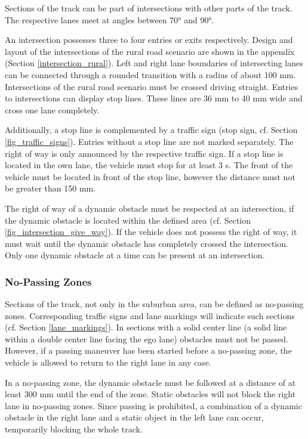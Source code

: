 Sections of the track can be part of intersections with other parts of the
track. The respective lanes meet at angles between 70° and 90°.

An intersection possesses three to four entries or exits respectively. Design
and layout of the intersections of the rural road scenario are shown in the
appendix (Section \ref{intersection_rural}). Left and right lane boundaries of
intersecting lanes can be connected through a rounded transition with a radius
of about 100 mm. Intersections of the rural road scenario must be crossed
driving straight. Entries to intersections can display stop lines. These lines
are 36 mm to 40 mm wide and cross one lane completely.

Additionally, a stop line is complemented by a traffic sign (stop sign, cf.
Section \ref{fig_traffic_signs}). Entries without a stop line are not marked
separately. The right of way is only announced by the respective traffic sign.
If a stop line is located in the own lane, the vehicle must stop for at least 3
s. The front of the vehicle must be located in front of the stop line, however
the distance must not be greater than 150 mm.

The right of way of a dynamic obstacle must be respected at an intersection, if
the dynamic obstacle is located within the defined area (cf. Section
\ref{fig_intersection_give_way}). If the vehicle does not possess the right of
way, it must wait until the dynamic obstacle has completely crossed the
intersection. Only one dynamic obstacle at a time can be present at an
intersection.

\subsubsection{No-Passing Zones}
\label{no_passing_zones}

Sections of the track, not only in the suburban area, can be defined as
no-passing zones. Corresponding traffic signs and lane markings will indicate
such sections (cf. Section \ref{lane_markings}). In sections with a solid
center line (a solid line within a double center line facing the ego lane)
obstacles must not be passed. However, if a passing maneuver has been started
before a no-passing zone, the vehicle is allowed to return to the right lane in
any case.

In a no-passing zone, the dynamic obstacle must be followed at a distance of at
least 300 mm until the end of the zone. Static obstacles will not block the
right lane in no-passing zones. Since passing is prohibited, a combination of a
dynamic obstacle in the right lane and a static object in the left lane can
occur, temporarily blocking the whole track.

